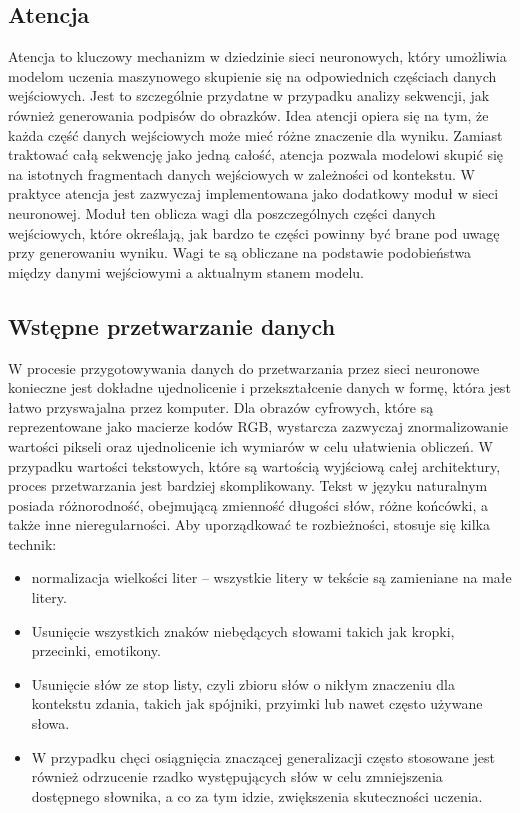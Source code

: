 \subsection{Atencja}
Atencja to kluczowy mechanizm w dziedzinie sieci neuronowych, który umożliwia modelom uczenia maszynowego skupienie się na odpowiednich częściach danych wejściowych. Jest to szczególnie przydatne w przypadku analizy sekwencji, jak również generowania podpisów do obrazków. Idea atencji opiera się na tym, że każda część danych wejściowych może mieć różne znaczenie dla wyniku. Zamiast traktować całą sekwencję jako jedną całość, atencja pozwala modelowi skupić się na istotnych fragmentach danych wejściowych w zależności od kontekstu. W praktyce atencja jest zazwyczaj implementowana jako dodatkowy moduł w sieci neuronowej. Moduł ten oblicza wagi dla poszczególnych części danych wejściowych, które określają, jak bardzo te części powinny być brane pod uwagę przy generowaniu wyniku. Wagi te są obliczane na podstawie podobieństwa między danymi wejściowymi a aktualnym stanem modelu.
\subsection{Wstępne przetwarzanie danych}
W procesie przygotowywania danych do przetwarzania przez sieci neuronowe konieczne jest dokładne ujednolicenie i przekształcenie danych w formę, która jest łatwo przyswajalna przez komputer. Dla obrazów cyfrowych, które są reprezentowane jako macierze kodów RGB, wystarcza zazwyczaj znormalizowanie wartości pikseli oraz ujednolicenie ich wymiarów w celu ułatwienia obliczeń. W przypadku wartości tekstowych, które są wartością wyjściową całej architektury, proces przetwarzania jest bardziej skomplikowany. Tekst w języku naturalnym posiada różnorodność, obejmującą zmienność długości słów, różne końcówki, a także inne nieregularności. Aby uporządkować te rozbieżności, stosuje się kilka technik:
\begin{itemize}
  \item normalizacja wielkości liter -- wszystkie litery w tekście są zamieniane na małe litery.
  \item Usunięcie wszystkich znaków niebędących słowami takich jak kropki, przecinki, emotikony.
  \item Usunięcie słów ze stop listy, czyli zbioru słów o nikłym znaczeniu dla kontekstu zdania, takich jak spójniki, przyimki lub nawet często używane słowa.
  \item W przypadku chęci osiągnięcia znaczącej generalizacji często stosowane jest również odrzucenie rzadko występujących słów w celu zmniejszenia dostępnego słownika, a co za tym idzie, zwiększenia skuteczności uczenia.
\end{itemize}
